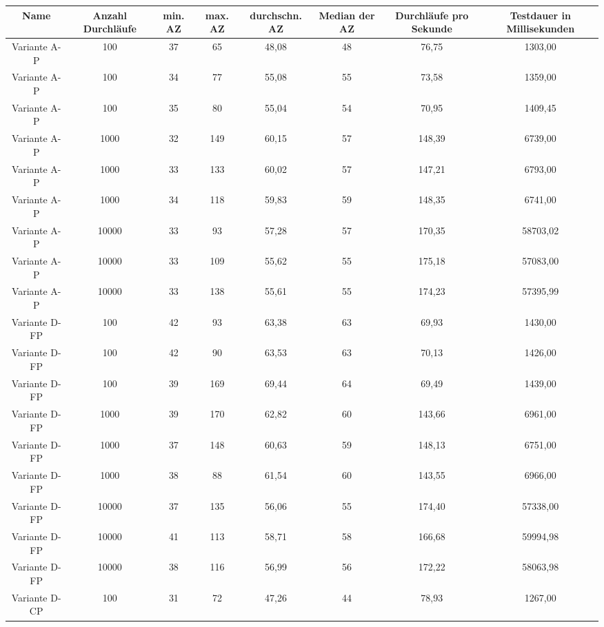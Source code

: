 \begin{landscape}
	\begin{table}[h!]
		\centering
		\small
		\begin{tabular}{ |c|c|c|c|c|c|c|c|} 
			\hline
			Name & Anzahl Durchläufe & min. AZ & max. AZ & durchschn. AZ & Median der AZ & Durchläufe pro Sekunde & Testdauer in Millisekunden \\ 
			\hline
			Variante A-P & 100 & 37 & 65 & 48,08 & 48 & 76,75 & 1303,00 \\
			\hline
			Variante A-P & 100 & 34 & 77 & 55,08 & 55 & 73,58 & 1359,00 \\
			\hline
			Variante A-P & 100 & 35 & 80 & 55,04 & 54 & 70,95 & 1409,45 \\
			\hline
			Variante A-P & 1000 & 32 & 149 & 60,15 & 57 & 148,39 & 6739,00 \\
			\hline
			Variante A-P & 1000 & 33 & 133 & 60,02 & 57 & 147,21 & 6793,00 \\
			\hline
			Variante A-P & 1000 & 34 & 118 & 59,83 & 59 & 148,35 & 6741,00 \\
			\hline
			Variante A-P & 10000 & 33 & 93 & 57,28 & 57 & 170,35 & 58703,02 \\
			\hline
			Variante A-P & 10000 & 33 & 109 & 55,62 & 55 & 175,18 & 57083,00 \\
			\hline
			Variante A-P & 10000 & 33 & 138 & 55,61 & 55 & 174,23 & 57395,99 \\
			\hline
			Variante D-FP & 100 & 42 & 93 & 63,38 & 63 & 69,93 & 1430,00 \\
			\hline
			Variante D-FP & 100 & 42 & 90 & 63,53 & 63 & 70,13 & 1426,00 \\
			\hline
			Variante D-FP & 100 & 39 & 169 & 69,44 & 64 & 69,49 & 1439,00 \\
			\hline
			Variante D-FP & 1000 & 39 & 170 & 62,82 & 60 & 143,66 & 6961,00 \\
			\hline
			Variante D-FP & 1000 & 37 & 148 & 60,63 & 59 & 148,13 & 6751,00 \\
			\hline
			Variante D-FP & 1000 & 38 & 88 & 61,54 & 60 & 143,55 & 6966,00 \\
			\hline
			Variante D-FP & 10000 & 37 & 135 & 56,06 & 55 & 174,40 & 57338,00 \\
			\hline
			Variante D-FP & 10000 & 41 & 113 & 58,71 & 58 & 166,68 & 59994,98 \\
			\hline
			Variante D-FP & 10000 & 38 & 116 & 56,99 & 56 & 172,22 & 58063,98 \\
			\hline
			Variante D-CP & 100 & 31 & 72 & 47,26 & 44 & 78,93 & 1267,00 \\

\end{tabular}
\end{table}
\end{landscape}
